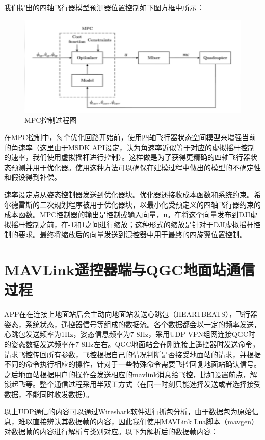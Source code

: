 我们提出的四轴飞行器模型预测器位置控制如下图方框中所示：

\begin{figure}[ht]
  \centering
  \includegraphics[width=0.8\linewidth]{./Figure/MPC-Diagram.png}
  \caption{MPC控制过程图}\label{Fig:xd1}
\end{figure}

在MPC控制中，每个优化回路开始前，使用四轴飞行器状态空间模型来增强当前的角速率（这里由于MSDK API设定，认为角速率近似等于对应的虚拟摇杆控制的速率，我们使用虚拟摇杆进行控制）。这样做是为了获得更精确的四轴飞行器状态预测并用于优化器。使用这种方法可以确保在建模过程中做出的模型的不确定性和假设得到补偿。

速率设定点从姿态控制器发送到优化器块。优化器还接收成本函数和系统约束。希尔德雷斯的二次规划程序被用于优化器块，以最小化受预定义的四轴飞行器约束的成本函数。MPC控制器的输出是控制或输入向量，u。在将这个向量发布到DJI虚拟摇杆控制之前，在-1和1之间进行缩放；这种形式的缩放是针对于DJI虚拟摇杆控制的要求。最终将缩放后的向量发送到混控器中用于最终的四旋翼位置控制。

\section{MAVLink遥控器端与QGC地面站通信过程}

APP在在连接上地面站后会主动向地面站发送心跳包（HEARTBEATS），飞行器姿态，系统状态，遥控器信号等组成的数据流。各个数据都会以一定的频率发送，心跳包发送频率为1Hz，姿态信息频率为7-8Hz，采用UDP VPN组网连接QGC时的姿态数据发送频率在7-8Hz左右。QGC地面站会在刚连接上遥控器时发送命令，请求飞控传回所有参数，飞控根据自己的情况判断是否接受地面站的请求，并根据不同的命令执行相应的操作，针对于一些特殊命令需要飞控回复地面站确认信号。之后地面站根据用户的操作会发送相应的mavlink消息给飞控，比如设置航点，解锁起飞等。整个通信过程采用半双工方式（在同一时刻只能选择发送或者选择接受数据，不能同时收发数据）。

以上UDP通信的内容可以通过Wireshark软件进行抓包分析，由于数据包为原始信息，难以直接辨认其数据帧的内容，因此我们使用MAVLink Lua脚本（mavgen）对数据帧的内容进行解析与类别对应。以下为解析后的数据帧内容：


